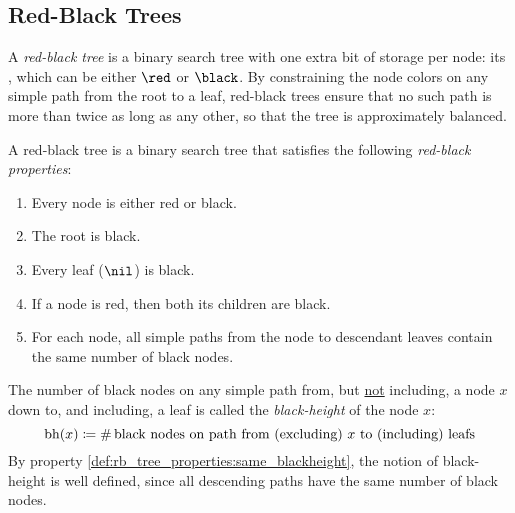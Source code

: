 \subsection{Red-Black Trees}
\label{subsec:rb_tree}
A \emph{red-black tree} is a binary search tree with one extra bit of storage per node:
its , which can be either $\red$ or $\black$.
By constraining the node colors on any simple path from the root to a leaf, red-black trees ensure that no such path is more than twice as long as any other, so that the tree is approximately balanced.
\begin{definition}
  \label{def:rb_tree_properties}
  A red-black tree is a binary search tree that satisfies the following \emph{red-black properties}:
  \begin{enumerate}[before={\parskip=0pt},nosep]
    \item Every node is either red or black. \label{def:rb_tree_properties:color}
    \item The root is black. \label{def:rb_tree_properties:root_isblack}
    \item Every leaf ($\nil$) is black. \label{def:rb_tree_properties:leafs_areblack}
    \item If a node is red, then both its children are black. \label{def:rb_tree_properties:redparent_blackchildren}
    \item For each node, all simple paths from the node to descendant leaves contain the same number of black nodes.\label{def:rb_tree_properties:same_blackheight} \qedhere
  \end{enumerate}
\end{definition}
\begin{definition}
The number of black nodes on any simple path from, but \underline{not} including, a node $x$ down to, and including, a leaf is called the \emph{black-height} of the node $x$:
\[
\operatorname{bh}(x) \coloneqq \# \, \text{black nodes on path from (excluding) } x \text{ to (including) leafs}
\]
By property \ref{def:rb_tree_properties:same_blackheight}, the notion of black-height is well defined, since all descending paths have the same number of black nodes.
\end{definition}


